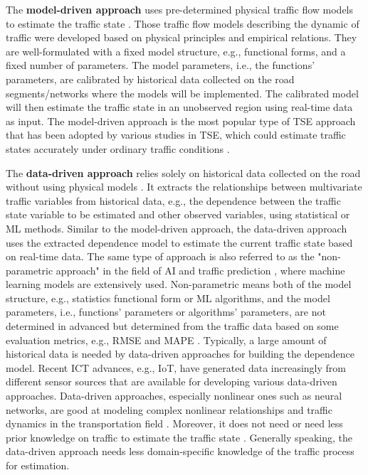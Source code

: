 \documentclass[english]{kththesis}
\begin{document}
The \textbf{model-driven approach} uses pre-determined physical traffic flow models to estimate the traffic state \cite{seo_tse}. Those traffic flow models describing the dynamic of traffic were developed based on physical principles and empirical relations. They are well-formulated with a fixed model structure, e.g., functional forms, and a fixed number of parameters. The model parameters, i.e., the functions' parameters, are calibrated by historical data collected on the road segments/networks where the models will be implemented. The calibrated model will then estimate the traffic state in an unobserved region using real-time data as input. The model-driven approach is the most popular type of TSE approach that has been adopted by various studies in TSE, which could estimate traffic states accurately under ordinary traffic conditions \cite{seo_tse}.

The \textbf{data-driven approach} relies solely on historical data collected on the road without using physical models \cite{seo_tse}. It extracts the relationships between multivariate traffic variables from historical data, e.g., the dependence between the traffic state variable to be estimated and other observed variables, using statistical or ML methods. Similar to the model-driven approach, the data-driven approach uses the extracted dependence model to estimate the current traffic state based on real-time data. The same type of approach is also referred to as the "non-parametric approach" in the field of AI and traffic prediction \cite{van_traffic_prediction_models}, where machine learning models are extensively used. Non-parametric means both of the model structure, e.g., statistics functional form or ML algorithms, and the model parameters, i.e., functions' parameters or algorithms' parameters, are not determined in advanced but determined from the traffic data based on some evaluation metrics, e.g., RMSE and MAPE \cite{van_traffic_prediction_models}. Typically, a large amount of historical data is needed by data-driven approaches for building the dependence model. Recent ICT advances, e.g., IoT, have generated data increasingly from different sensor sources that are available for developing various data-driven approaches. Data-driven approaches, especially nonlinear ones such as neural networks, are good at modeling complex nonlinear relationships and traffic dynamics in the transportation field \cite{seo_tse, vlahogianni_forecast_overview, van_traffic_prediction_models}. Moreover, it does not need or need less prior knowledge on traffic to estimate the traffic state \cite{tsanakas_emission_estimation}. Generally speaking, the data-driven approach needs less domain-specific knowledge of the traffic process for estimation.
\end{document}
